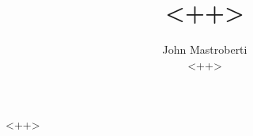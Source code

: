 \documentclass[12pt]{article}
\begin{document}
\title{<++>}
\author{John Mastroberti\\
<++>}

\maketitle

<++>
\end{document}
